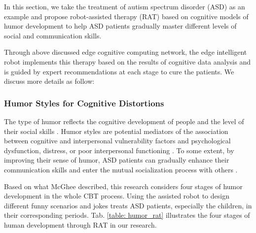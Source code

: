 \documentclass[letterpaper]{article} %
\begin{document}
In this section, we take the treatment of autism spectrum disorder (ASD) as an example and propose robot-assisted therapy (RAT) based on cognitive models of humor development to help ASD patients gradually master different levels of social and communication skills. 

Through above discussed edge cognitive computing network, the edge intelligent robot implements this therapy based on the results of cognitive data analysis and is guided by expert recommendations at each stage to cure the patients. We discuss more details as follow:

\subsubsection{Humor Styles for Cognitive Distortions}

The type of humor reflects the cognitive development of people and the level of their social skills \cite{bernet1993humor}. Humor styles are potential mediators of the association between cognitive and interpersonal vulnerability factors and psychological dysfunction, distress, or poor interpersonal functioning \cite{rnic2016cognitive}. To some extent, by improving their sense of humor, ASD patients can gradually enhance their communication skills and enter the mutual socialization process with others \cite{southam2005humor}.

Based on what McGhee \cite{mcghee1979humor} described, this research considers four stages of humor development in the whole CBT process. Using the assisted robot to design different funny scenarios and jokes treats ASD patients, especially the children, in their corresponding periods. Tab. \ref{table: humor_rat} illustrates the four stages of human development through RAT in our research.
\end{document}
